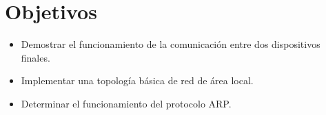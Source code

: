 \section*{Objetivos}

{
    \renewcommand{\labelitemi}{$\triangleright$}
    \begin{itemize}
        \item Demostrar el funcionamiento de la comunicaci\'on entre dos dispositivos finales.
        \item Implementar una topolog\'ia b\'asica de red de \'area local.
        \item Determinar el funcionamiento del protocolo ARP.
    \end{itemize}
}